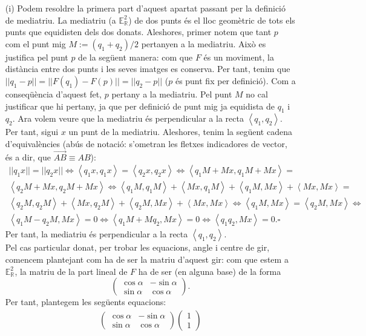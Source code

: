 \documentclass[10pt]{article}
\newcommand{\euc}[1]{\mathbb{E}_{\mathbb{R}}^{#1}}
\newcommand{\norm}[1]{||#1||}
\newcommand{\scal}[2]{\left<#1,#2\right>}
\begin{document}
\begin{itemize}
\item[(i)] Podem resoldre la primera part d'aquest apartat passant per la definició de mediatriu. La mediatriu (a $\euc{2}$) de dos punts és el lloc geomètric de tots els punts que equidisten dels dos donats. Aleshores, primer notem que tant $p$ com el punt mig $M:=(q_1+q_2)/2$ pertanyen a la mediatriu. Això es justifica pel punt $p$ de la següent manera: com que $F$ és un moviment, la distància entre dos punts i les seves imatges es conserva. Per tant, tenim que $\norm{q_1-p}=\norm{F(q_1)-F(p)}=\norm{q_2-p}$ ($p$ és punt fix per definició). Com a conseqüència d'aquest fet, $p$ pertany a la mediatriu. Pel punt $M$ no cal justificar que hi pertany, ja que per definició de punt mig ja equidista de $q_1$ i $q_2$. Ara volem veure que la mediatriu és perpendicular a la recta $\left<q_1,q_2\right>$. Per tant, sigui $x$ un punt de la mediatriu. Aleshores, tenim la següent cadena d'equivalències (abús de notació: s'ometran les fletxes indicadores de vector, és a dir, que $\vec{AB}\equiv AB$):
    \begin{multline*}
	\norm{q_1x}=\norm{q_2x}\iff\scal{q_1x}{q_1x}=\scal{q_2x}{q_2x}\iff\scal{q_1M+Mx}{q_1M+Mx}= \\ \scal{q_2M+Mx}{q_2M+Mx}\iff\scal{q_1M}{q_1M}+\scal{Mx}{q_1M}+\scal{q_1M}{Mx}+\scal{Mx}{Mx}= \\ \scal{q_2M}{q_2M}+\scal{Mx}{q_2M}+\scal{q_2M}{Mx}+\scal{Mx}{Mx}\iff\scal{q_1M}{Mx}=\scal{q_2M}{Mx}\iff \\ \scal{q_1M-q_2M}{Mx}=0\iff\scal{q_1M+Mq_2}{Mx}=0\iff\scal{q_1q_2}{Mx}=0.\square
    \end{multline*}
    Per tant, la mediatriu és perpendicular a la recta $\scal{q_1}{q_2}$.\\
    Pel cas particular donat, per trobar les equacions, angle i centre de gir, comencem plantejant com ha de ser la matriu d'aquest gir: com que estem a $\euc{2}$, la matriu de la part lineal de $F$ ha de ser (en alguna base) de la forma
    \[
    \begin{pmatrix}
    \cos{\alpha} & -\sin{\alpha}\\
    \sin{\alpha} & \cos{\alpha}
    \end{pmatrix}.
    \]
    Per tant, plantegem les següents equacions:
    \begin{align}
        \begin{pmatrix}
        \cos{\alpha} & -\sin{\alpha}\\
        \sin{\alpha} & \cos{\alpha}
        \end{pmatrix}\begin{pmatrix}1\\ 1

\end{pmatrix}
\end{align}
\end{itemize}
\end{document}
